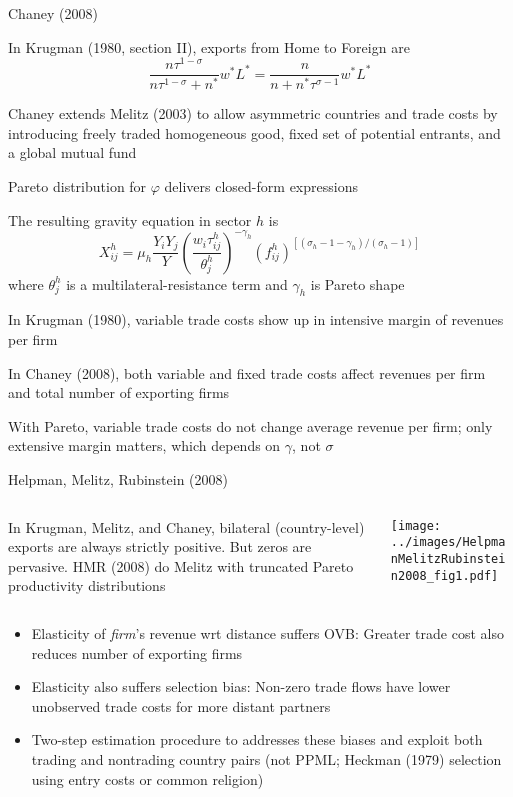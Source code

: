 \documentclass[10pt,notes=hide]{beamer}
\begin{document}
\begin{frame}{Chaney (2008)}
\begin{itemize}
{\small
	\item In Krugman (1980, section II), exports from Home to Foreign are
	$$
	\frac{n \tau^{1-\sigma}}{n \tau^{1-\sigma} + n^*} w^*L^*
	=
	\frac{n}{n+n^* \tau^{\sigma-1}} w^*L^*
	$$
	\item Chaney extends Melitz (2003) to allow asymmetric countries and trade costs by introducing freely traded homogeneous good, fixed set of potential entrants, and a global mutual fund
	\item Pareto distribution for $\varphi$ delivers closed-form expressions
	\item The resulting gravity equation in sector $h$ is
	$$
	X_{ij}^{h}= \mu_h \frac{Y_i Y_j}{Y}
	\left(\frac{w_i \tau_{ij}^h}{\theta_j^h}\right)^{-\gamma_h}
	\left(f_{ij}^{h}\right)^{[(\sigma_h-1-\gamma_h)/(\sigma_h-1)]}
	$$
	where $\theta_j^h$ is a multilateral-resistance term and $\gamma_h$ is Pareto shape 
	\item In Krugman (1980), variable trade costs show up in intensive margin of revenues per firm
	\item In Chaney (2008), both variable and fixed trade costs affect revenues per firm and total number of exporting firms
	\item With Pareto, variable trade costs do not change average revenue per firm; only extensive margin matters, which depends on $\gamma$, not $\sigma$
}
\end{itemize}
\end{frame}
\begin{frame}{Helpman, Melitz, Rubinstein (2008)}
\begin{columns}
\begin{column}{.4\textwidth}
In Krugman, Melitz, and Chaney, bilateral (country-level) exports are always strictly positive. But zeros are pervasive.
HMR (2008) do Melitz with truncated Pareto productivity distributions 
\end{column}
\begin{column}{.6\textwidth}
\texttt{[image: ../images/HelpmanMelitzRubinstein2008\_fig1.pdf]}
\end{column}
\end{columns}
\begin{itemize}
	\item Elasticity of \textit{firm}'s revenue wrt distance suffers OVB: 
	Greater trade cost also reduces number of exporting firms
	\item Elasticity also suffers selection bias: 
	Non-zero trade flows have lower unobserved trade costs for more distant partners
	\item Two-step estimation procedure to addresses these biases and exploit both trading and nontrading country pairs (not PPML; Heckman (1979) selection using entry costs or common religion)
\end{itemize}
\end{frame}
\end{document}
